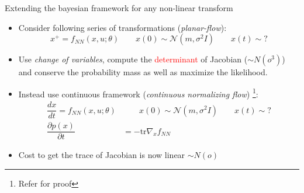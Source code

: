 \documentclass[dvipsnames, 9pt]{beamer}
\begin{document}
\begin{frame}{Extending the bayesian framework for any non-linear transform}
    \begin{itemize}
        \item Consider following series of transformations (\textit{planar-flow}):
        \[
        x^+ = f_{NN}(x, u; \theta) \qquad x(0) \sim \mathcal{N}(m, \sigma^2I) \qquad x(t) \sim ?
        \]
        \item Use \textit{change of variables}, compute the
        \textcolor{red}{determinant} of Jacobian ($\sim N(o^3)$) and conserve the probability mass as well
        as maximize the likelihood.
        \item Instead use continuous framework (\textit{continuous normalizing flow}) \footnote{Refer \cite{chen:rubanova:bettencourt:duvenaud:2018} for proof}:
        \begin{align*}
        \dfrac{dx}{dt} = f_{NN}(x, u; \theta) &\qquad x(0) \sim \mathcal{N}(m, \sigma^2I) \qquad x(t) \sim ?\\
        \dfrac{\partial p(x)}{\partial t} &=  -\mathrm{tr}\nabla_x f_{NN}
        \end{align*}
        \item Cost to get the trace of Jacobian is now linear $\sim N(o)$
    \end{itemize}
\end{frame}
\end{document}
